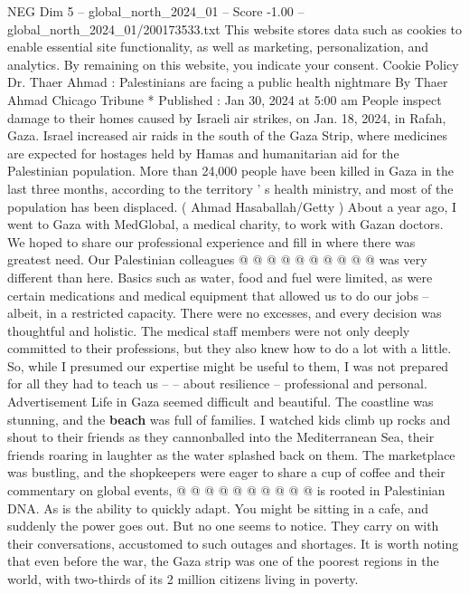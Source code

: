 \begin{textsample}{NEG Dim 5 – global\_north\_2024\_01 – Score -1.00 – global\_north\_2024\_01/200173533.txt}  \label{ex:f5_neg_341}
This website stores data such as cookies to enable essential site functionality, as well as marketing, personalization, and analytics.
By remaining on this website, you indicate your consent.
Cookie Policy Dr.
Thaer Ahmad : Palestinians are facing a public health nightmare By Thaer Ahmad Chicago Tribune * Published : Jan 30, 2024 at 5:00 am People inspect damage to their homes caused by Israeli air strikes, on Jan. 18, 2024, in Rafah, Gaza.
Israel increased air raids in the south of the Gaza Strip, where medicines are expected for hostages held by Hamas and humanitarian aid for the Palestinian population.
More than 24,000 people have been killed in Gaza in the last three months, according to the territory ' s health ministry, and most of the population has been displaced. ( Ahmad Hasaballah/Getty ) About a year ago, I went to Gaza with MedGlobal, a medical charity, to work with Gazan doctors.
We hoped to share our professional experience and fill in where there was greatest need.
Our Palestinian colleagues @ @ @ @ @ @ @ @ @ @ was very different than here.
Basics such as water, food and fuel were limited, as were certain medications and medical equipment that allowed us to do our jobs -- albeit, in a restricted capacity.
There were no excesses, and every decision was thoughtful and holistic.
The medical staff members were not only deeply committed to their professions, but they also knew how to do a lot with a little.
So, while I presumed our expertise might be useful to them, I was not prepared for all they had to teach us -- -- about resilience -- professional and personal.
Advertisement Life in Gaza seemed difficult and beautiful.
The coastline was stunning, and the \textbf{beach} was full of families.
I watched kids climb up rocks and shout to their friends as they cannonballed into the Mediterranean Sea, their friends roaring in laughter as the water splashed back on them.
The marketplace was bustling, and the shopkeepers were eager to share a cup of coffee and their commentary on global events, @ @ @ @ @ @ @ @ @ @ is rooted in Palestinian DNA.
As is the ability to quickly adapt.
You might be sitting in a cafe, and suddenly the power goes out.
But no one seems to notice.
They carry on with their conversations, accustomed to such outages and shortages.
It is worth noting that even before the war, the Gaza strip was one of the poorest regions in the world, with two-thirds of its 2 million citizens living in poverty.

\end{textsample}
